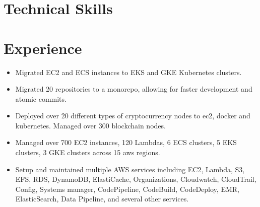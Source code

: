 \documentclass[10pt,a4paper,roman]{moderncv} %
\begin{document}
\makecvtitle %


\section{Technical Skills}






\section{Experience}
{
\begin{itemize}
\item Migrated EC2 and ECS instances to EKS and GKE Kubernetes clusters.
\item Migrated 20 repositories to a monorepo, allowing for faster development and atomic commits.
\item Deployed over 20 different types of cryptocurrency nodes to ec2, docker and kubernetes. Managed over 300 blockchain nodes. 
\item Managed over 700 EC2 instances, 120 Lambdas, 6 ECS clusters, 5 EKS clusters, 3 GKE clusters across 15 aws regions.
\item Setup and maintained multiple AWS services including EC2, Lambda, S3, EFS, RDS, DynamoDB, ElastiCache, Organizations, Cloudwatch, CloudTrail, Config, Systems manager, CodePipeline, CodeBuild, CodeDeploy, EMR, ElasticSearch, Data Pipeline, and several other services.
\end{itemize}}
\end{document}
